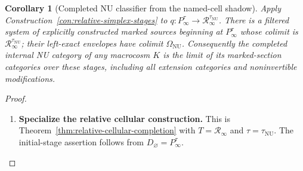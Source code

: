 \documentclass[oneside]{article}
\theoremstyle{plain}
\newtheorem{corollary}[theorem]{Corollary}
\theoremstyle{definition}
\theoremstyle{remark}
\newcommand{\NU}{\mathrm{NU}}
\newcommand{\RNU}{\mathcal R_{\infty}}
\begin{document}
\begin{corollary}[Completed NU classifier from the named-cell shadow]
\label{cor:NU-relative-completion}
Apply Construction~\ref{con:relative-simplex-stages} to
$q:P_\infty^\tau\to\RNU^{\tau_{\NU}}$. There is a filtered
system of explicitly constructed marked sources beginning at
$P_\infty^\tau$ whose colimit is $\RNU^{\tau_{\NU}}$; their
left-exact envelopes have colimit $\Omega_{\NU}$. Consequently the
completed internal NU category of any macrocosm $K$ is the limit of
its marked-section categories over these stages, including all
extension categories and noninvertible modifications.
\end{corollary}
\begin{proof}
\leavevmode
\begin{enumerate}
\item \textbf{Specialize the relative cellular construction.}
This is Theorem~\ref{thm:relative-cellular-completion} with
$T=\RNU$ and $\tau=\tau_{\NU}$. The initial-stage assertion follows
from $D_\varnothing=P_\infty^\tau$.
\qedhere
\end{enumerate}
\end{proof}
\end{document}

